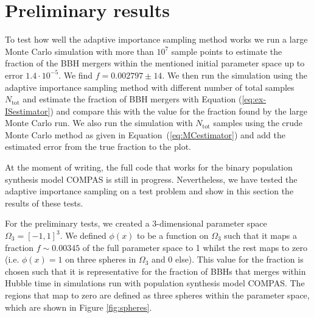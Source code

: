 \documentclass[a4paper,fleqn,usenatbib]{mnras}
\begin{document}
\section{Preliminary results}
To test how well the adaptive importance sampling method works we run a large Monte Carlo simulation with more than $10^7 $ sample points to estimate the fraction of the BBH mergers within the mentioned initial parameter space up to error $1.4 \cdot 10^{-5}$. We find $f = 0.002797 \pm 14$. We then run the simulation using the adaptive importance sampling method with different number of total samples $N_{\text{tot}}$ and estimate the fraction of BBH mergers with Equation (\ref{eq:ex-ISestimator}) and compare this with the value for the fraction found by the large Monte Carlo run. We also run the simulation with $N_{\text{tot}}$ samples using the crude Monte Carlo method as given in Equation~(\ref{eq:MCestimator}) and add the estimated  error from the true fraction to the plot. 

At the moment of writing, the full code that works for the binary population synthesis model COMPAS is still in progress. Nevertheless, we have tested the adaptive importance sampling on a test problem and show in this section the results of these tests. 

For the preliminary tests, we created a 3-dimensional parameter space $\Omega_3 = [-1,1]^3$. We defined $\phi(x)$ to be a function on $\Omega_3$ such that it maps a fraction $f \sim 0.00345 $ of the full parameter space  to 1 whilst the rest maps to zero (i.e. $\phi(x) = 1$ on three spheres in $\Omega_3$ and $0$ else). This value for the fraction is chosen such that it is representative for the fraction of BBHs that merges within Hubble time in simulations run with population synthesis model COMPAS. The regions that map to zero are defined as three spheres within the parameter space, which are shown in Figure \ref{fig:spheres}.
\end{document}
